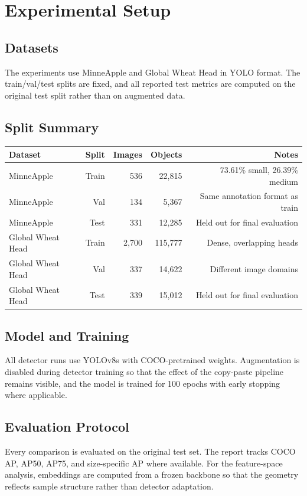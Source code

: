 \section{Experimental Setup}

\subsection{Datasets}
The experiments use MinneApple and Global Wheat Head in YOLO format. The train/val/test splits are fixed, and all reported test metrics are computed on the original test split rather than on augmented data.

\subsection{Split Summary}
\begin{center}
\small
\begin{tabular}{@{}lrrrr@{}}
\toprule
\textbf{Dataset} & \textbf{Split} & \textbf{Images} & \textbf{Objects} & \textbf{Notes} \\
\midrule
MinneApple & Train & 536 & 22,815 & 73.61\% small, 26.39\% medium \\
MinneApple & Val & 134 & 5,367 & Same annotation format as train \\
MinneApple & Test & 331 & 12,285 & Held out for final evaluation \\
Global Wheat Head & Train & 2,700 & 115,777 & Dense, overlapping heads \\
Global Wheat Head & Val & 337 & 14,622 & Different image domains \\
Global Wheat Head & Test & 339 & 15,012 & Held out for final evaluation \\
\bottomrule
\end{tabular}
\end{center}

\subsection{Model and Training}
All detector runs use YOLOv8s with COCO-pretrained weights. Augmentation is disabled during detector training so that the effect of the copy-paste pipeline remains visible, and the model is trained for 100 epochs with early stopping where applicable.

\subsection{Evaluation Protocol}
Every comparison is evaluated on the original test set. The report tracks COCO AP, AP50, AP75, and size-specific AP where available. For the feature-space analysis, embeddings are computed from a frozen backbone so that the geometry reflects sample structure rather than detector adaptation.
